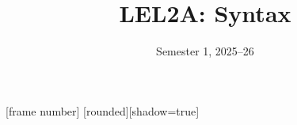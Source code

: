 \usepackage{hyperref} %
\usepackage{graphicx} %
\usepackage[linguistics]{forest} %
\usepackage{multicol} %
\usepackage{gb4e} %
\primebars %
\noautomath
\usepackage{tipa} %
\usepackage[T1]{fontenc} %
\usepackage[utf8]{inputenc}
\usepackage[normalem]{ulem} %
\usepackage{setspace}
\usepackage{pifont} %

\title{LEL2A: Syntax}
\date{Semester 1, 2025--26}%


[frame number]
[rounded][shadow=true]

\newcommand{\cmark}{\ding{51}}
\newcommand{\xmark}{\ding{55}}
\newcommand\trace{\rule[-0.5ex]{0.5cm}{.4pt}}

